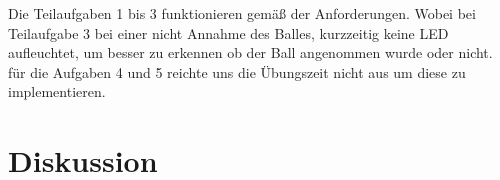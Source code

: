 \documentclass[a4paper]{article}
\begin{document}
      Die Teilaufgaben 1 bis 3 funktionieren gemäß der Anforderungen. Wobei bei Teilaufgabe 3 bei einer nicht Annahme des Balles, kurzzeitig keine LED aufleuchtet, um besser zu erkennen ob der Ball angenommen wurde oder nicht.\\
      für die Aufgaben 4 und 5 reichte uns die Übungszeit nicht aus um diese zu implementieren.

    \section{Diskussion}

    \blindtext
    \blindtext
    

    \newpage
    \listoffigures
    \listoftables
\end{document}
